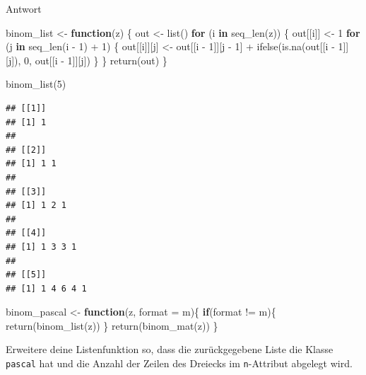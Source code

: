 \documentclass[
]{book}
\newenvironment{Shaded}{\begin{snugshade}}{\end{snugshade}}
\newcommand{\AttributeTok}[1]{\textcolor[rgb]{0.77,0.63,0.00}{#1}}
\newcommand{\ControlFlowTok}[1]{\textcolor[rgb]{0.13,0.29,0.53}{\textbf{#1}}}
\newcommand{\DecValTok}[1]{\textcolor[rgb]{0.00,0.00,0.81}{#1}}
\newcommand{\FunctionTok}[1]{\textcolor[rgb]{0.00,0.00,0.00}{#1}}
\newcommand{\NormalTok}[1]{#1}
\newcommand{\OtherTok}[1]{\textcolor[rgb]{0.56,0.35,0.01}{#1}}
\newcommand{\SpecialCharTok}[1]{\textcolor[rgb]{0.00,0.00,0.00}{#1}}
\newcommand{\StringTok}[1]{\textcolor[rgb]{0.31,0.60,0.02}{#1}}
\begin{document}
Antwort

\begin{Shaded}
\begin{Highlighting}[]
\NormalTok{binom\_list }\OtherTok{\textless{}{-}} \ControlFlowTok{function}\NormalTok{(z) \{}
\NormalTok{  out }\OtherTok{\textless{}{-}} \FunctionTok{list}\NormalTok{()}
  \ControlFlowTok{for}\NormalTok{ (i }\ControlFlowTok{in} \FunctionTok{seq\_len}\NormalTok{(z)) \{}
\NormalTok{    out[[i]] }\OtherTok{\textless{}{-}} \DecValTok{1}
    \ControlFlowTok{for}\NormalTok{ (j }\ControlFlowTok{in} \FunctionTok{seq\_len}\NormalTok{(i }\SpecialCharTok{{-}} \DecValTok{1}\NormalTok{) }\SpecialCharTok{+} \DecValTok{1}\NormalTok{) \{}
\NormalTok{      out[[i]][j] }\OtherTok{\textless{}{-}}
\NormalTok{        out[[i }\SpecialCharTok{{-}} \DecValTok{1}\NormalTok{]][j }\SpecialCharTok{{-}} \DecValTok{1}\NormalTok{] }\SpecialCharTok{+} \FunctionTok{ifelse}\NormalTok{(}\FunctionTok{is.na}\NormalTok{(out[[i }\SpecialCharTok{{-}} \DecValTok{1}\NormalTok{]][j]), }
                                     \DecValTok{0}\NormalTok{, }
\NormalTok{                                     out[[i }\SpecialCharTok{{-}} \DecValTok{1}\NormalTok{]][j])}
\NormalTok{    \}}
\NormalTok{  \}}
  \FunctionTok{return}\NormalTok{(out)}
\NormalTok{\}}

\FunctionTok{binom\_list}\NormalTok{(}\DecValTok{5}\NormalTok{)}
\end{Highlighting}
\end{Shaded}

\begin{verbatim}
## [[1]]
## [1] 1
## 
## [[2]]
## [1] 1 1
## 
## [[3]]
## [1] 1 2 1
## 
## [[4]]
## [1] 1 3 3 1
## 
## [[5]]
## [1] 1 4 6 4 1
\end{verbatim}

\begin{Shaded}
\begin{Highlighting}[]
\NormalTok{binom\_pascal }\OtherTok{\textless{}{-}} \ControlFlowTok{function}\NormalTok{(z, }\AttributeTok{format =} \StringTok{\textquotesingle{}m\textquotesingle{}}\NormalTok{)\{}
  \ControlFlowTok{if}\NormalTok{(format }\SpecialCharTok{!=} \StringTok{\textquotesingle{}m\textquotesingle{}}\NormalTok{)\{}
    \FunctionTok{return}\NormalTok{(}\FunctionTok{binom\_list}\NormalTok{(z))}
\NormalTok{  \}}
  \FunctionTok{return}\NormalTok{(}\FunctionTok{binom\_mat}\NormalTok{(z))}
\NormalTok{\}}
\end{Highlighting}
\end{Shaded}

Erweitere deine Listenfunktion so, dass die zurückgegebene Liste die Klasse \texttt{pascal} hat und die Anzahl der Zeilen des Dreiecks im \texttt{n}-Attribut abgelegt wird.
\end{document}
